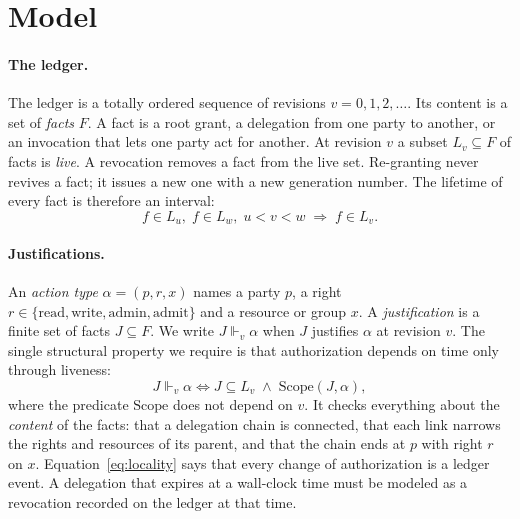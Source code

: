 \documentclass[aps,prx,reprint,superscriptaddress,nofootinbib,floatfix]{revtex4-2}
\theoremstyle{remark}
\newcommand{\Live}{L}                     %
\newcommand{\justifies}{\Vdash}           %
\newcommand{\Static}{\mathrm{Scope}}
\begin{document}
\section{Model}\label{sec:model}

\paragraph*{The ledger.} The ledger is a totally ordered sequence of revisions $v=0,1,2,\dots$. Its content is a set of \emph{facts} $F$. A fact is a root grant, a delegation from one party to another, or an invocation that lets one party act for another. At revision $v$ a subset $\Live_v\subseteq F$ of facts is \emph{live}. A revocation removes a fact from the live set. Re-granting never revives a fact; it issues a new one with a new generation number. The lifetime of every fact is therefore an interval:
\begin{equation}
f\in \Live_u,\; f\in \Live_w,\; u<v<w \;\Longrightarrow\; f\in \Live_v .
\label{eq:interval}
\end{equation}

\paragraph*{Justifications.} An \emph{action type} $\alpha=(p,r,x)$ names a party $p$, a right $r\in\{\text{read},\text{write},\text{admin},\text{admit}\}$ and a resource or group $x$. A \emph{justification} is a finite set of facts $J\subseteq F$. We write $J\justifies_v\alpha$ when $J$ justifies $\alpha$ at revision $v$. The single structural property we require is that authorization depends on time only through liveness:
\begin{equation}
J\justifies_v\alpha \iff J\subseteq \Live_v \;\wedge\; \Static(J,\alpha),
\label{eq:locality}
\end{equation}
where the predicate $\Static$ does not depend on $v$. It checks everything about the \emph{content} of the facts: that a delegation chain is connected, that each link narrows the rights and resources of its parent, and that the chain ends at $p$ with right $r$ on $x$. Equation~\eqref{eq:locality} says that every change of authorization is a ledger event. A delegation that expires at a wall-clock time must be modeled as a revocation recorded on the ledger at that time.
\end{document}
